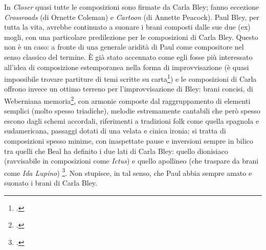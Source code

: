 In \textit{Closer} quasi tutte le composizioni sono firmate da Carla Bley; fanno eccezione \textit{Crossroads} (di Ornette Coleman) e \textit{Cartoon} (di Annette Peacock). Paul Bley, per tutta la vita, avrebbe continuato a suonare i brani composti dalle sue due (ex) mogli, con una particolare predilezione per le composizioni di Carla Bley. Questo non è un caso: a fronte di una generale aridità di Paul come compositore nel senso classico del termine. È già stato accennato come egli fosse più interessato all'idea di composizione estemporanea nella forma di improvvisazione (è quasi impossibile trovare partiture di temi scritte su carta\footcite[24]{cappelletti}) e le composizioni di Carla offrono invece un ottimo terreno per l'improvvisazione di Bley: brani concisi, di Weberniana memoria\footcite[22]{carla}, con armonie composte dal raggruppamento di elementi semplici (molto spesso triadiche), melodie estremamente cantabili che però spesso escono dagli schemi accordali, riferimenti a tradizioni folk come quella spagnola e sudamericana, passaggi dotati di una velata e cinica ironia; si tratta di composizioni spesso minime, con inaspettate pause e inversioni sempre in bilico tra quelli che Beal ha definito i due lati di Carla Bley: quello dionisiaco (ravvisabile in composizioni come \textit{Ictus}) e quello apollineo (che traspare da brani come \textit{Ida Lupino}) \footcite[18]{carla}. Non stupisce, in tal senso, che Paul abbia sempre amato e suonato i brani di Carla Bley. \par
